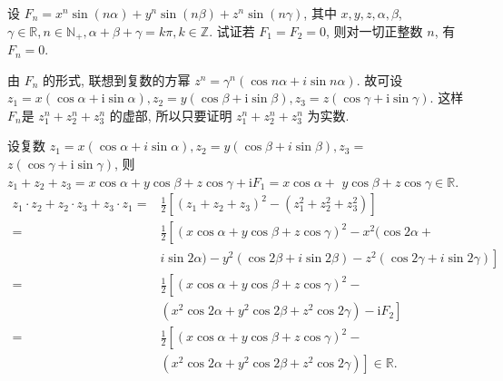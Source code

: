 \begin{example}
	设 $F_{n}=x^{n} \sin (n \alpha)+y^{n} \sin (n \beta)+z^{n} \sin (n \gamma)$, 其中 $x, y, z, \alpha, \beta$, $\gamma \in \mathbb{R}, n \in \mathbb{N}_{+}, \alpha+\beta+\gamma=k \pi, k \in \mathbb{Z}$. 试证若 $F_{1}=F_{2}=0$, 则对一切正整数 $n$, 有 $F_{n}=0$.
\end{example}
\begin{analysis}
	由 $F_{n}$ 的形式, 联想到复数的方幂 $z^{n}=\gamma^{n}(\cos n \alpha+i \sin n \alpha)$. 故可设 $z_{1}=x(\cos \alpha+\mathrm{i} \sin \alpha), z_{2}=y(\cos \beta+\mathrm{i} \sin \beta), z_{3}=z(\cos \gamma+\mathrm{i} \sin \gamma)$. 这样 $F_{n}$是 $z_{1}^{n}+z_{2}^{n}+z_{3}^{n}$ 的虚部, 所以只要证明 $z_{1}^{n}+z_{2}^{n}+z_{3}^{n}$ 为实数.
\end{analysis}
\begin{solution}
	设复数 $z_{1}=x(\cos \alpha+i \sin \alpha), z_{2}=y(\cos \beta+i \sin \beta), z_{3}=$ $z(\cos \gamma+\mathrm{i} \sin \gamma)$, 则 $z_{1}+z_{2}+z_{3}=x \cos \alpha+y \cos \beta+z \cos \gamma+\mathrm{i} F_{1}=x \cos \alpha+$ $y \cos \beta+z \cos \gamma \in \mathbb{R}$.
	$$
		\begin{aligned}
			z_{1} \cdot z_{2}+z_{2} \cdot z_{3}+z_{3} \cdot z_{1}= & \frac{1}{2}\left[\left(z_{1}+z_{2}+z_{3}\right)^{2}-\left(z_{1}^{2}+z_{2}^{2}+z_{3}^{2}\right)\right] \\
			=                                                      & \frac{1}{2}\left[(x \cos \alpha+y \cos \beta+z \cos \gamma)^{2}-x^{2}(\cos 2 \alpha+\right.           \\
			                                                       & \left.i \sin 2 \alpha)-y^{2}(\cos 2 \beta+i \sin 2 \beta)-z^{2}(\cos 2 \gamma+i \sin 2 \gamma)\right] \\
			=                                                      & \frac{1}{2}\left[(x \cos \alpha+y \cos \beta+z \cos \gamma)^{2}-\right.                               \\
			                                                       & \left.\left(x^{2} \cos 2 \alpha+y^{2} \cos 2 \beta+z^{2} \cos 2 \gamma\right)-\mathrm{i} F_{2}\right] \\
			=                                                      & \frac{1}{2}\left[(x \cos \alpha+y \cos \beta+z \cos \gamma)^{2}-\right.                               \\
			                                                       & \left.\left(x^{2} \cos 2 \alpha+y^{2} \cos 2 \beta+z^{2} \cos 2 \gamma\right)\right] \in \mathbb{R} .
		\end{aligned}
	$$


\end{solution}
